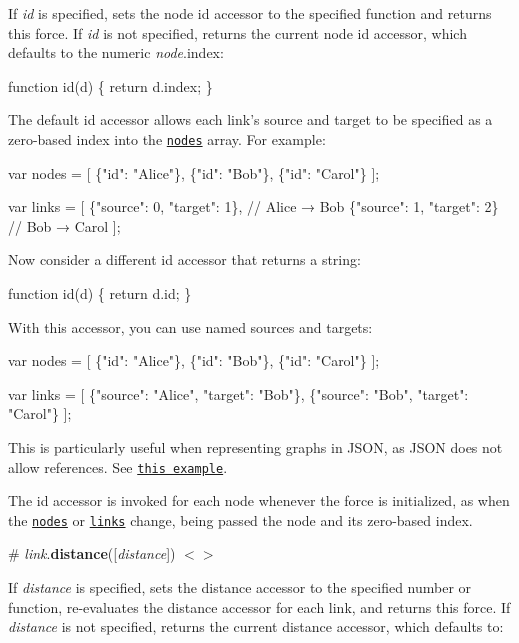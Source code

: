 If {\itshape id} is specified, sets the node id accessor to the specified function and returns this force. If {\itshape id} is not specified, returns the current node id accessor, which defaults to the numeric {\itshape node}.index\+:


\begin{DoxyCode}
function id(d) \{
  return d.index;
\}
\end{DoxyCode}


The default id accessor allows each link’s source and target to be specified as a zero-\/based index into the \href{#simulation_nodes}{\tt nodes} array. For example\+:


\begin{DoxyCode}
var nodes = [
  \{"id": "Alice"\},
  \{"id": "Bob"\},
  \{"id": "Carol"\}
];

var links = [
  \{"source": 0, "target": 1\}, // Alice → Bob
  \{"source": 1, "target": 2\} // Bob → Carol
];
\end{DoxyCode}


Now consider a different id accessor that returns a string\+:


\begin{DoxyCode}
function id(d) \{
  return d.id;
\}
\end{DoxyCode}


With this accessor, you can use named sources and targets\+:


\begin{DoxyCode}
var nodes = [
  \{"id": "Alice"\},
  \{"id": "Bob"\},
  \{"id": "Carol"\}
];

var links = [
  \{"source": "Alice", "target": "Bob"\},
  \{"source": "Bob", "target": "Carol"\}
];
\end{DoxyCode}


This is particularly useful when representing graphs in J\+S\+ON, as J\+S\+ON does not allow references. See \href{http://bl.ocks.org/mbostock/f584aa36df54c451c94a9d0798caed35}{\tt this example}.

The id accessor is invoked for each node whenever the force is initialized, as when the \href{#simulation_nodes}{\tt nodes} or \href{#link_links}{\tt links} change, being passed the node and its zero-\/based index.

\label{_link_distance}%
\# {\itshape link}.{\bfseries distance}(\mbox{[}{\itshape distance}\mbox{]}) \href{https://github.com/d3/d3-force/blob/master/src/link.js#L108}{\tt $<$$>$}

If {\itshape distance} is specified, sets the distance accessor to the specified number or function, re-\/evaluates the distance accessor for each link, and returns this force. If {\itshape distance} is not specified, returns the current distance accessor, which defaults to\+:


